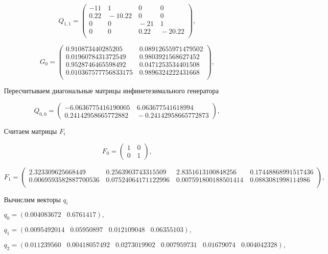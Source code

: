 \documentclass[12pt, a4paper]{article}
\begin{document}
    $$
Q_{1,1} = \left(\begin{array}{cccc}
-11 & \,1 & \,0 & \,0  \\
0.22 & \,-10.22 & \,0 & \,0  \\
0 & \,0 & \,-21& \,1  \\
0 & \,0 & \,0.22 & \,-20.22  \\
\end{array}\right),
$$


 $$
G_0 = \left(\begin{array}{cc}
0.910873440285205& \,0.08912655971479502  \\
0.0196078431372549 & \,0.9803921568627452  \\
0.9528746465598492 & \,0.0471253534401508\\
0.010367577756833175 & \,0.9896324222431668 \\
\end{array}\right),
$$

Пересчитываем диагональные матрицы инфинетезимального генератора

    $$
Q_{0,0} = \left(\begin{array}{cc}
-6.0636775416190005 & \,6.063677541618994 \\
0.24142958665772882 & \,-0.24142958665772873 
\end{array}\right),
$$

Считаем матрицы $F_i$

    $$
F_0 = \left(\begin{array}{cc}
1 & \,0\\
0 & \,1
\end{array}\right),
$$



$$
F_1 = \left(\begin{array}{cccc}
2.323309625668449 & \,0.2563903743315509 & \,2.8351613100848256& \,0.17448868991517436   \\
0.0069593582887700536& \,0.07524064171122996 & \,0.007591800188501414 & \,0.0883081998114986   \\
\end{array}\right),
$$

Вычислим векторы $q_i$

$
q_0 = (0.004083672 \;\;\;0.6761417 ),
$

$
q_1 = (0.0095492014  \;\;\; 0.05950897 \;\;\; 0.012109048 \;\;\; 0.06355103),
$

$
q_2 = (0.011239560  \;\;\; 0.00418057492 \;\;\; 0.0273019902 \;\;\;  0.007959731   \;\;\; 0.01679074  \;\;\;  0.004042328 ),
$
\end{document}
